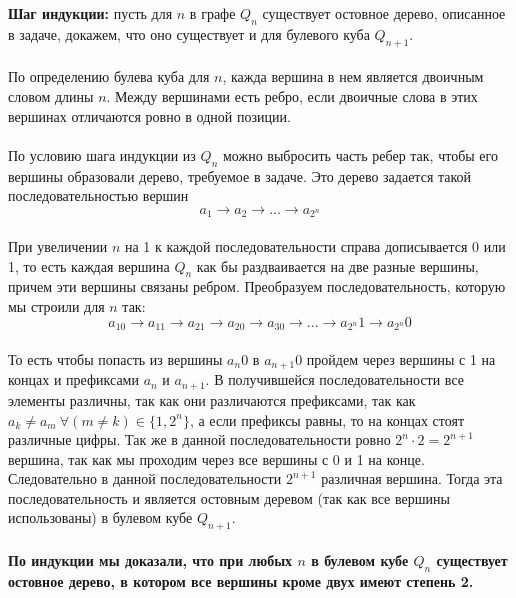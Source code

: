 \documentclass[a4paper, 12pt]{article}
\begin{document}
    \\
    \\ \textbf{Шаг индукции: } пусть для $n$ в графе $Q_n$ существует остовное дерево, описанное в задаче, докажем, что оно существует и для булевого куба $Q_{n + 1}$.
    \\
    \\ По определению булева куба для $n$, кажда вершина в нем является двоичным словом длины $n$. Между вершинами есть ребро, если двоичные слова в этих вершинах отличаются ровно в одной позиции.
    \\
    \\ По условию шага индукции из $Q_n$ можно выбросить часть ребер так, чтобы его вершины образовали дерево, требуемое в задаче. Это дерево задается такой последовательностью вершин \[a_1 \to a_2 \to ... \to a_{2^n}\]
    \\ При увеличении $n$ на 1 к каждой последовательности справа дописывается 0 или 1, то есть каждая вершина $Q_n$ как бы раздваивается на две разные вершины, причем эти вершины связаны ребром. Преобразуем последовательность, которую мы строили для $n$ так:
    \[
        a_10 \to a_11 \to a_21 \to a_20 \to a_30 \to ... \to a_{2^n}1 \to a_{2^n}0
    \]
    \\ То есть чтобы попасть из вершины $a_n0$ в $a_{n + 1}0$ пройдем через вершины с 1 на концах и префиксами $a_n$ и $a_{n + 1}$. В получившейся последовательности все элементы различны, так как они различаются префиксами, так как $a_k \neq a_m \ \forall (m \neq k) \in \{1, 2^n\}$, а если префиксы равны, то на концах стоят различные цифры. Так же в данной последовательности ровно $2^n \cdot 2 = 2^{n + 1}$ вершина, так как мы проходим через все вершины с 0 и 1 на конце. Следовательно в данной последовательности $2^{n + 1}$ различная вершина. Тогда эта последовательность и является остовным деревом (так как все вершины использованы) в булевом кубе $Q_{n + 1}$.
    \\
    \\ \textbf{По индукции мы доказали, что при любых $n$ в булевом кубе $Q_n$ существует остовное дерево, в котором все вершины кроме двух имеют степень 2.}
\end{document}
